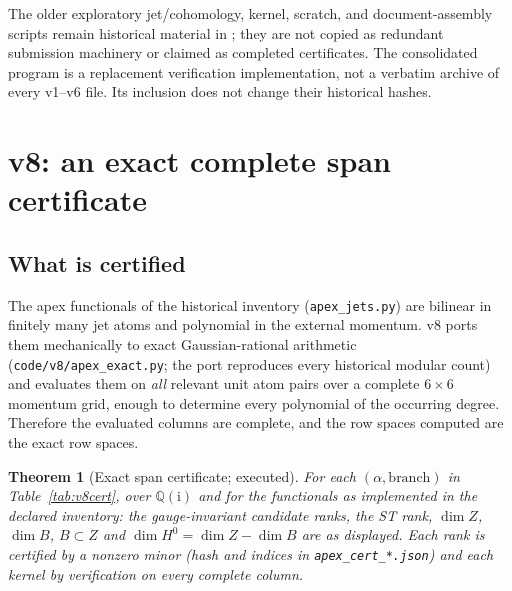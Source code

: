 \documentclass[11pt,a4paper]{article}
\newcommand{\ii}{\mathrm i}
\newcommand{\loc}[1]{\nolinkurl{#1}}
\theoremstyle{plain}
\newtheorem{theorem}{Theorem}[section]
\theoremstyle{definition}
\theoremstyle{remark}
\numberwithin{equation}{section}
\begin{document}
The older exploratory jet/cohomology, kernel, scratch, and
document-assembly scripts remain historical material in
\cite{CheungConeScripts}; they are not copied as redundant
submission machinery or claimed as completed certificates.
The consolidated program is a replacement verification
implementation, not a verbatim archive of every v1--v6 file.
Its inclusion does not change their historical hashes.



\section{v8: an exact complete span certificate}
\label{sec:v8cert}

\subsection{What is certified}

The apex functionals of the historical inventory
(\loc{apex_jets.py}) are bilinear in finitely many jet atoms and
polynomial in the external momentum. v8 ports them mechanically to
exact Gaussian-rational arithmetic (\loc{code/v8/apex_exact.py};
the port reproduces every historical modular count) and evaluates
them on \emph{all} relevant unit atom pairs over a complete
\(6\times6\) momentum grid, enough to determine every polynomial of
the occurring degree. Therefore the evaluated columns are complete,
and the row spaces computed are the exact row spaces.

\begin{theorem}[Exact span certificate; executed]
\label{thm:v8cert}
For each \((\alpha,\text{branch})\) in Table~\ref{tab:v8cert}, over
\(\mathbb Q(\ii)\) and for the functionals as implemented in the
declared inventory:
the gauge-invariant candidate ranks, the ST rank, \(\dim Z\),
\(\dim B\), \(B\subset Z\) and \(\dim H^0=\dim Z-\dim B\) are as
displayed. Each rank is certified by a nonzero minor (hash and
indices in \loc{apex_cert_*.json}) and each kernel by verification
on every complete column.
\end{theorem}
\end{document}
